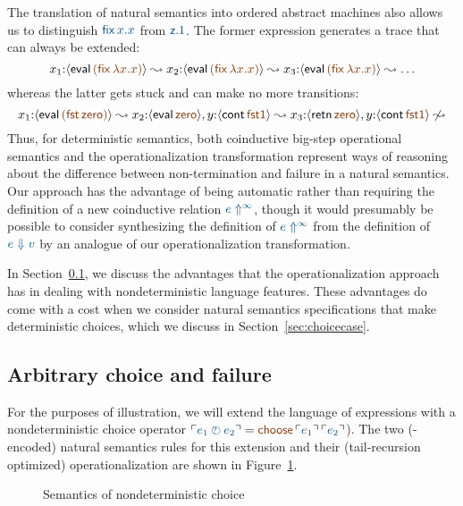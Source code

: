 The translation of natural semantics into ordered abstract machines
also allows us to distinguish $\obj{{\sf fix}\,x.x}$ from $\obj{{\sf z}.1}$.
The former expression generates a trace that can always be extended:
\[ x_1{:}\susp{{\sf eval}\,\lf{({\sf fix}\,\lambda x.x)}} \leadsto
   x_2{:}\susp{{\sf eval}\,\lf{({\sf fix}\,\lambda x.x)}} \leadsto
   x_3{:}\susp{{\sf eval}\,\lf{({\sf fix}\,\lambda x.x)}} \leadsto \ldots 
\]whereas the latter gets stuck and can make no more transitions:\[ 
  x_1{:}\susp{{\sf eval}\,\lf{({\sf fst}\,{\sf zero})}} \leadsto
  x_2{:}\susp{{\sf eval}\,\lf{\sf zero}}, y{:}\susp{{\sf cont}\,\lf{\sf fst1}} \leadsto
  x_3{:}\susp{{\sf retn}\,\lf{\sf zero}}, y{:}\susp{{\sf cont}\,\lf{\sf fst1}} 
  \not\leadsto
\]
Thus, for deterministic semantics, both coinductive big-step
operational semantics and the operationalization transformation
represent ways of reasoning about the difference between
non-termination and failure in a natural semantics. Our approach has
the advantage of being automatic rather than requiring the definition
of a new coinductive relation $\obj{e \Uparrow^\infty}$, though it would
presumably be possible to consider synthesizing the definition of $\obj{e
\Uparrow^\infty}$ from the definition of $\obj{e \Downarrow v}$ by an
analogue of our operationalization transformation.

In Section~\ref{sec:choicefail}, we discuss the advantages that the
operationalization approach has in dealing with nondeterministic
language features. These advantages do come with a cost when 
we consider natural semantics specifications that make deterministic
choices, which we discuss in Section~\ref{sec:choicecase}.

\subsection{Arbitrary choice and failure}
\label{sec:choicefail}

For the purposes of illustration, we will extend the language of
expressions with a nondeterministic choice operator $\interp{e_1 \arb
  e_2} = \lf{{\sf choose}\,\interp{e_1}\,\interp{e_2}}$).  The two
(\sls-encoded) natural semantics rules for this extension and their
(tail-recursion optimized) operationalization are shown in
Figure~\ref{fig:ns-arb}.

\begin{figure}[t]
\begin{minipage}[b]{0.45\linewidth}
\end{minipage}
\hspace{0.5cm}
\begin{minipage}[b]{0.55\linewidth}
\end{minipage}
\caption{Semantics of nondeterministic choice}
\label{fig:ns-arb}
\end{figure}


